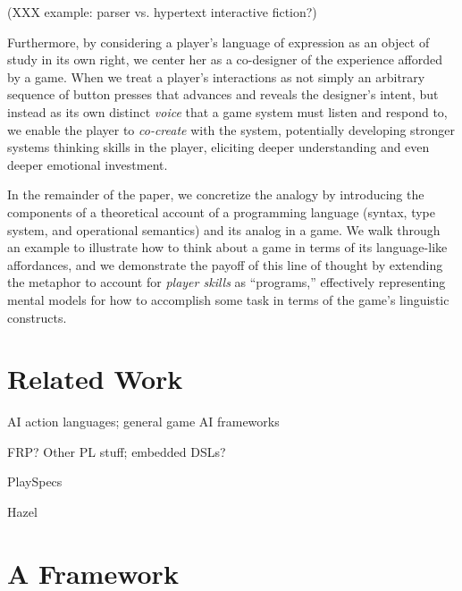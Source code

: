 \documentclass[sigconf]{acmart}
\begin{document}
(XXX example: parser vs. hypertext interactive fiction?)

Furthermore, by considering a player's language of expression as an object
of study in its own right, we center her as a co-designer of the experience
afforded by a game. When we treat a player's interactions as not simply an
arbitrary sequence of button presses that advances and reveals the
designer's intent, but instead as its own distinct {\em voice} that a game
system must listen and respond to, we enable the player to {\em co-create}
with the system, potentially developing stronger systems thinking skills in
the player, eliciting deeper understanding and even deeper emotional
investment.

In the remainder of the paper, we concretize the analogy by introducing the
components of a theoretical account of a programming language (syntax, type
system, and operational semantics) and its analog in a game. We walk
through an example to illustrate how to think about a game in terms of its
language-like affordances, and we demonstrate the payoff of this line of
thought by extending the metaphor to account for {\em player skills} as
``programs,'' effectively representing mental models for how to accomplish
some task in terms of the game's linguistic constructs.


\section{Related Work}

AI action languages; general game AI frameworks

FRP? Other PL stuff; embedded DSLs?

PlaySpecs

Hazel

\section{A Framework}


\end{document}
